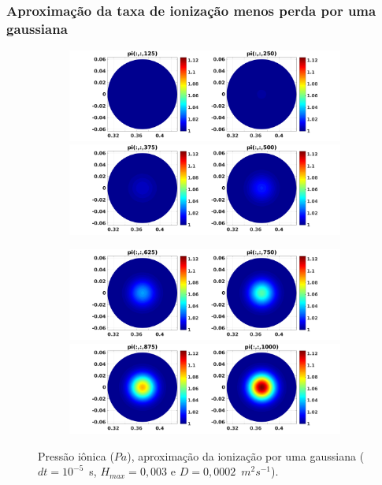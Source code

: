\documentclass[aspectratio=169]{beamer}
\begin{document}
\begin{frame}
\frametitle{Aproximação da taxa de ionização menos perda por uma gaussiana}
\begin{figure}[H]
\begin{subfigure}{0.43\textwidth}
\includegraphics[scale=0.24]{../SImulacao_breakdown/PDE/pitod1B6.png}  
\includegraphics[scale=0.24]{../SImulacao_breakdown/PDE/pitod2B6.png} 
\end{subfigure}
\begin{subfigure}{0.43\textwidth}
\includegraphics[scale=0.24]{../SImulacao_breakdown/PDE/pitod3B6.png} 
\includegraphics[scale=0.24]{../SImulacao_breakdown/PDE/pitod4B6.png} 
\end{subfigure}
\caption{Pressão iônica ($Pa$), aproximação da ionização por uma gaussiana ($dt=10^{-5}$\ s, $H_{max} = 0,003$ e $D=0,0002$\ $m^2s^{-1}$).}
\end{figure}
\end{frame}
\end{document}
